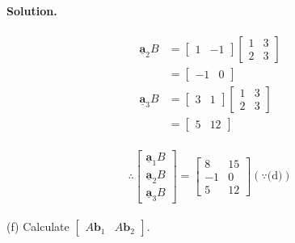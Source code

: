 \paragraph{Solution.}
\begin{align*}
    \underline{\mathbf{a}}_2B &= \begin{bmatrix}
        1&-1
    \end{bmatrix}\begin{bmatrix}
        1&3\\2&3
    \end{bmatrix}\\&=\begin{bmatrix}
        -1&0
    \end{bmatrix}\\
    \underline{\mathbf{a}}_3B &= \begin{bmatrix}
        3&1
    \end{bmatrix}\begin{bmatrix}
        1&3\\2&3
    \end{bmatrix}\\&=\begin{bmatrix}
        5&12
    \end{bmatrix}
\end{align*}\\
$$\therefore \begin{bmatrix}
    \underline{\mathbf{a}}_1B\\
    \underline{\mathbf{a}}_2B\\
    \underline{\mathbf{a}}_3B
\end{bmatrix} = \begin{bmatrix}
    8&15\\-1&0\\5&12
\end{bmatrix}(\because \text{(d)})$$\\
\newpage
(f) Calculate $\begin{bmatrix}
    A\mathbf{b}_1&A\mathbf{b}_2
\end{bmatrix}$.
